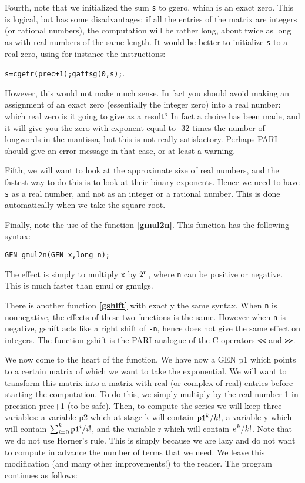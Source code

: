 Fourth, note that we initialized the sum {\tt s} to gzero, which is an exact
zero. This is logical, but has some disadvantages: if all the entries of the
matrix are integers (or rational numbers), the computation will be rather
long, about twice as long as with real numbers of the same length. 
It would be better to initialize {\tt s} to a real zero, using for instance
the instructions:

{\tt s=cgetr(prec+1);gaffsg(0,s);}. 

However, this would not make much sense. In fact you should avoid making
an assignment of an exact zero (essentially the integer zero) into a real
number: which real zero is it going to give as a result? In fact a choice
has been made, and it will give you the zero with exponent equal to -32
times the number of longwords in the mantissa, but this is not really
satisfactory. Perhaps PARI should give an error message in that case, or
at least a warning.

Fifth, we will want to look at the approximate size of real numbers, and
the fastest way to do this is to look at their binary exponents. Hence we
need to have {\tt s} as a real number, and not as an integer or a rational
number. This is done automatically when we take the square root.

Finally, note the use of the function {\bf \ref{gmul2n}}. This function has the
following syntax:

{\tt GEN gmul2n(GEN x,long n);}

The effect is simply to multiply {\tt x} by $2^{\text n}$, where {\tt n} can
be positive or negative. This is much faster than gmul or gmulgs.

There is another function {\bf \ref{gshift}} with exactly the same syntax.
When {\tt n} is nonnegative, the effects of these two functions is the same.
However when {\tt n} is negative, gshift acts like a right shift of {\tt -n},
hence does not give the same effect on integers. The function gshift is
the PARI analogue of the C operators {\tt <<} and {\tt >>}.

We now come to the heart of the function. We have now a GEN p1 which points
to a certain matrix of which we want to take the exponential. We will want
to transform this matrix into a matrix with real (or complex of real) entries
before starting the computation. To do this, we simply multiply by the real
number 1 in precision prec$+$1 (to be safe). Then, to compute the series
we will keep three variables: a variable p2 which
at stage k will contain ${\tt p1}^k/k!$, a variable y which will contain
$\sum_{i=0}^k {\tt p1}^i/i!$, and the variable r which will contain
${\tt s}^k/k!$. Note that we do not use Horner's rule. This is simply
because we are lazy and do not want to compute in advance the number of
terms that we need. We leave this modification (and many other improvements!)
to the reader. The program continues as follows:

